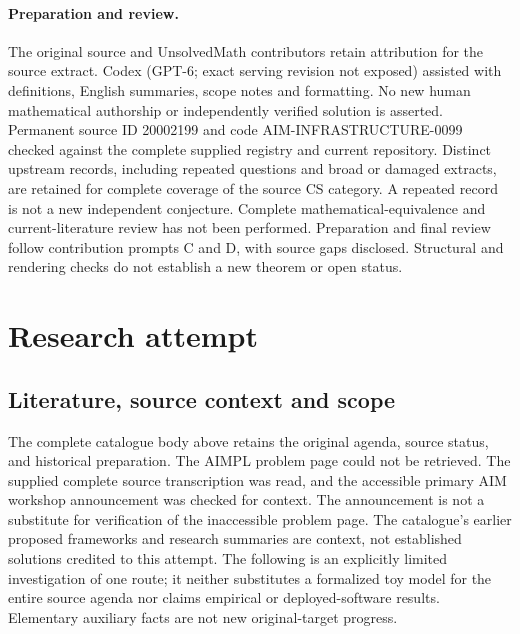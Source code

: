 \documentclass[11pt]{article}
\begin{document}
\paragraph{Preparation and review.}
The original source and UnsolvedMath contributors retain attribution for the source extract. Codex (GPT-6; exact serving revision not exposed) assisted with definitions, English summaries, scope notes and formatting. No new human mathematical authorship or independently verified solution is asserted. Permanent source ID 20002199 and code AIM-INFRASTRUCTURE-0099 checked against the complete supplied registry and current repository. Distinct upstream records, including repeated questions and broad or damaged extracts, are retained for complete coverage of the source CS category. A repeated record is not a new independent conjecture. Complete mathematical-equivalence and current-literature review has not been performed. Preparation and final review follow contribution prompts C and D, with source gaps disclosed. Structural and rendering checks do not establish a new theorem or open status.
\label{end:20002199}

\section{Research attempt}
\subsection{Literature, source context and scope}
The complete catalogue body above retains the original agenda, source status, and historical preparation. The AIMPL problem page could not be retrieved. The supplied complete source transcription was read, and the accessible primary AIM workshop announcement was checked for context. The announcement is not a substitute for verification of the inaccessible problem page. The catalogue's earlier proposed frameworks and research summaries are context, not established solutions credited to this attempt. The following is an explicitly limited investigation of one route; it neither substitutes a formalized toy model for the entire source agenda nor claims empirical or deployed-software results. Elementary auxiliary facts are not new original-target progress.
\end{document}
